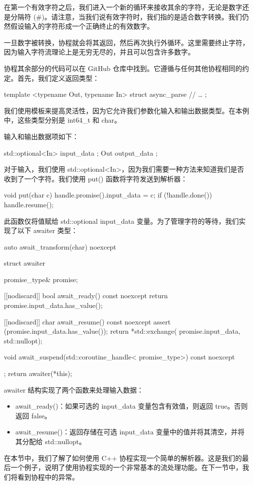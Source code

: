 在第一个有效字符之后，我们进入一个新的循环来接收其余的字符，无论是数字还是分隔符 (\#)。请注意，当我们说有效字符时，我们指的是适合数字转换。我们仍然假设输入的字符形成一个正确终止的有效数字。

一旦数字被转换，协程就会将其返回，然后再次执行外循环。这里需要终止字符，因为输入字符流理论上是无穷无尽的，并且可以包含许多数字。

协程其余部分的代码可以在 GitHub 仓库中找到。它遵循与任何其他协程相同的约定。首先，我们定义返回类型：

\begin{cpp}
template <typename Out, typename In>
struct async_parse {
    // …
};
\end{cpp}

我们使用模板来提高灵活性，因为它允许我们参数化输入和输出数据类型。在本例中，这些类型分别是 int64\_t 和 char。

输入和输出数据项如下：

\begin{cpp}
std::optional<In> input_data { };
Out output_data { };
\end{cpp}

对于输入，我们使用 std::optional<In>，因为我们需要一种方法来知道我们是否收到了一个字符。我们使用 put() 函数将字符发送到解析器：

\begin{cpp}
void put(char c) {
    handle.promise().input_data = c;
    if (!handle.done()) {
        handle.resume();
    }
}
\end{cpp}

此函数仅将值赋给 std::optional input\_data 变量。为了管理字符的等待，我们实现了以下 awaiter 类型：

\begin{cpp}
auto await_transform(char) noexcept {
    struct awaiter {
        promise_type& promise;

        [[nodiscard]] bool await_ready() const noexcept {
            return promise.input_data.has_value();
        }

        [[nodiscard]] char await_resume() const noexcept {
            assert (promise.input_data.has_value());
            return *std::exchange(
                            promise.input_data,
                            std::nullopt);
        }

        void await_suspend(std::coroutine_handle<
                           promise_type>) const noexcept {
        }
    };
    return awaiter(*this);
}
\end{cpp}

awaiter 结构实现了两个函数来处理输入数据：

\begin{itemize}
\item
await\_ready()：如果可选的 input\_data 变量包含有效值，则返回 true。否则返回 false。

\item
await\_resume()：返回存储在可选 input\_data 变量中的值并将其清空，并将其分配给 std::nullopt。
\end{itemize}

在本节中，我们了解了如何使用 C++ 协程实现一个简单的解析器。这是我们的最后一个例子，说明了使用协程实现的一个非常基本的流处理功能。在下一节中，我们将看到协程中的异常。












